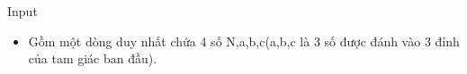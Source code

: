 Input
\begin{itemize}
	\item     Gồm một dòng duy nhất chứa 4 số N,a,b,c(a,b,c là 3 số được đánh vào 3 đỉnh của tam giác ban đầu).   
\end{itemize}
